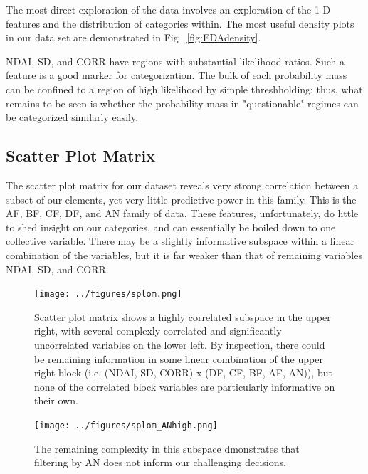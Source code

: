 \documentclass[english]{article}\usepackage{graphicx, color}
\numberwithin{equation}{section}
\numberwithin{figure}{section}
\begin{document}
The most direct exploration of the data involves an exploration of the 1-D 
features and the distribution of categories within. The most useful density 
plots in our data set are demonstrated in Fig ~\ref{fig:EDAdensity}.


NDAI, SD, and CORR have regions with substantial likelihood ratios. Such a 
feature is a good marker for categorization. The bulk of each probability mass 
can be confined to a region of high likelihood by simple threshholding: thus, 
what remains to be seen is whether the probability mass in "questionable" 
regimes can be categorized similarly easily.

\subsection{Scatter Plot Matrix}
The scatter plot matrix for our dataset reveals very strong correlation between
a subset of our elements, yet very little predictive power in this family. This is
the AF, BF, CF, DF, and AN family of data. These features, unfortunately, do
little to shed insight on our categories, and can essentially be boiled down to
one collective variable. There may be a slightly informative subspace within a
linear combination of the variables, but it is far weaker than that of remaining
variables NDAI, SD, and CORR.

\begin{figure}[!h]
  \begin{center}
    \texttt{[image: ../figures/splom.png]}
  \end{center}
  \caption{Scatter plot matrix shows a highly correlated subspace in the upper 
	right, with several complexly correlated and significantly uncorrelated
	variables on the lower left. By inspection, there could be remaining 
	information in some linear combination of the upper right block (i.e. 
	(NDAI, SD, CORR) x (DF, CF, BF, AF, AN)), but none of the correlated 
	block variables are particularly informative on their own.}
  \label{fig:EDAsplom}
\end{figure}

\begin{figure}[!h]
  \begin{center}
    \texttt{[image: ../figures/splom\_ANhigh.png]}
  \end{center}
  \caption{The remaining complexity in this subspace dmonstrates that filtering 
	by AN does not inform our challenging decisions.}
  \label{fig:EDAsplomANhigh}
\end{figure}
\end{document}
